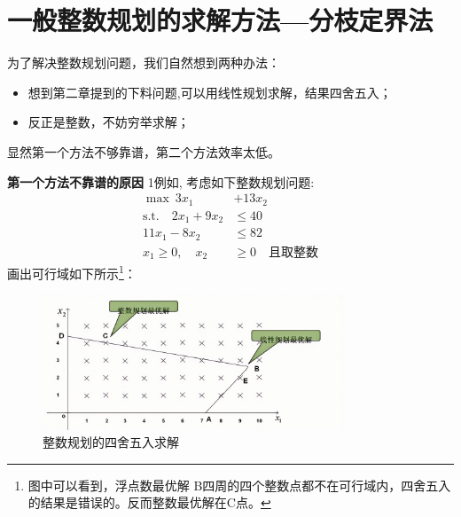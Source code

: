     \section{一般整数规划的求解方法—分枝定界法}
    为了解决整数规划问题，我们自然想到两种办法：
    \begin{itemize}
        \item 想到第二章提到的下料问题,可以用线性规划求解，结果四舍五入；
        \item 反正是整数，不妨穷举求解；
    \end{itemize}
    显然第一个方法不够靠谱，第二个方法效率太低。\\
    \begin{exbox}{\textbf{第一个方法不靠谱的原因}}
    1例如, 考虑如下整数规划问题:
    \begin{align}
        \max \ 3x_{1} &+ 13x_{2} \\
        \text{s.t.} \quad 2x_{1} + 9x_{2} &\leq 40 \\
        11x_{1} - 8x_{2} &\leq 82 \\
        x_{1} \geq 0, \quad x_{2} &\geq 0 \quad \text{且取整数}
    \end{align}
    画出可行域如下所示\footnote{图中可以看到，浮点数最优解 B四周的四个整数点都不在可行域内，四舍五入的结果是错误的。反而整数最优解在C点。}：
    \begin{figure}[H]
        \centering
        \includegraphics[width=0.8\textwidth]{./image/8.png}
        \caption{整数规划的四舍五入求解}
        \label{fig:Chapter4_Temporary_Pavilion_1}
    \end{figure}
    \end{exbox}

